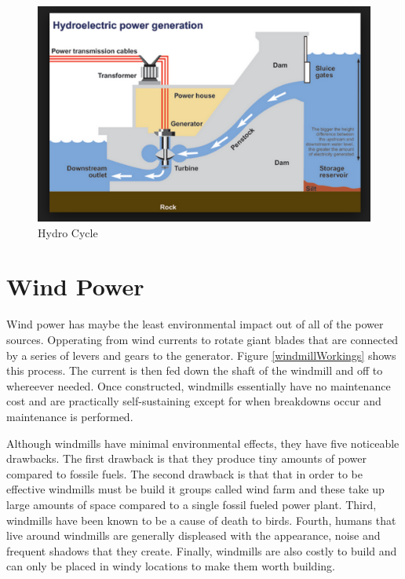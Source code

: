 \documentclass[msc,oneside]{ubcthesis}%
\begin{document}
\begin{figure}[hbt]\label{hydroCycle}
  \begin{center}
    \includegraphics[width=1\textwidth]{hydro}
    \caption[Hydro Cycle]{Hydro Cycle \cite{Hydro}}
  \end{center}
\end{figure}

\newpage

\section{Wind Power}

Wind power has maybe the least environmental impact out of all of the power sources. Opperating from wind currents to rotate giant blades that are connected by a series of levers and gears to the generator. Figure \ref{windmillWorkings} shows this process. The current is then fed down the shaft of the windmill and off to whereever needed. Once constructed, windmills essentially have no maintenance cost and are practically self-sustaining except for when breakdowns occur and maintenance is performed. 

Although windmills have minimal environmental effects, they have five noticeable drawbacks. The first drawback is that they produce tiny amounts of power compared to fossile fuels. The second drawback is that that in order to be effective windmills must be build it groups called wind farm and these take up large amounts of space compared to a single fossil fueled power plant. Third, windmills have been known to be a cause of death to birds. Fourth, humans that live around windmills are generally displeased with the appearance, noise and frequent shadows that they create. Finally, windmills are also costly to build and can only be placed in windy locations to make them worth building. 
\bigskip
\end{document}
